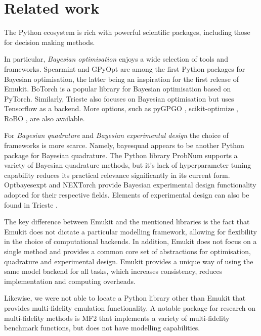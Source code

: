 \section{Related work}
The Python ecosystem is rich with powerful scientific packages, including those for decision making methods.

In particular, \emph{Bayesian optimisation} enjoys a wide selection of tools and frameworks. Spearmint \cite{snoek2012practical} and GPyOpt \cite{gpyopt2016} are among the first Python packages for Bayesian optimisation, the latter being an inspiration for the first release of Emukit. BoTorch \cite{balandat2020botorch} is a popular library for Bayesian optimisation based on PyTorch. Similarly, Trieste \cite{picheny2023trieste} also focuses on Bayesian optimisation but uses Tensorflow as a backend. More options, such as pyGPGO \cite{jimenez2017pygpgo}, scikit-optimize \cite{louppe2017bayesian}, RoBO \cite{klein-bayesopt17}, are also available.

For \emph{Bayesian quadrature} and \emph{Bayesian experimental design} the choice of frameworks is more scarce. Namely, bayesquad \cite{Charles2013} appears to be another Python package for Bayesian quadrature. The Python library ProbNum \cite{Wenger21} supports a variety of Bayesian quadrature methods, but it's lack of hyperparameter tuning capability reduces its practical relevance significantly in its current form. Optbayesexpt \cite{mcmichael2021optbayesexpt} and NEXTorch \cite{wang2021nextorch} provide Bayesian experimental design functionality adopted for their respective fields. Elements of experimental design can also be found in Trieste \cite{picheny2023trieste}.

The key difference between Emukit and the mentioned libraries is the fact that Emukit does not dictate a particular modelling framework, allowing for flexibility in the choice of computational backends. In addition, Emukit does not focus on a single method and provides a common core set of abstractions for optimisation, quadrature and experimental design. Emukit provides a unique way of using the same model backend for all tasks, which increases consistency, reduces implementation and computing overheads.

Likewise, we were not able to locate a Python library other than Emukit that provides multi-fidelity emulation functionality. A notable package for research on multi-fidelity methods is MF2 \cite{vanRijn2020} that implements a variety of multi-fidelity benchmark functions, but does not have modelling capabilities.

